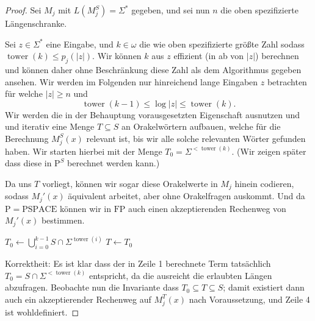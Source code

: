 \documentclass[nofonts]{uebung}
\theoremstyle{definition}
\def\P{\ensuremath{\mathrm{P}}}
\def\FP{\ensuremath{\mathrm{FP}}}
\def\PSPACE{\ensuremath{\mathrm{PSPACE}}}
\DeclareMathOperator{\tower}{tower}
\begin{document}
\begin{proof}
    Sei $M_j$ mit $L(M_j^S)=\Sigma^*$ gegeben, und sei nun $n$ die oben spezifizierte Längenschranke.

    Sei $z\in\Sigma^*$ eine Eingabe, und $k\in\omega$ die wie oben spezifizierte größte Zahl sodass $\tower(k)\leq p_j(|z|)$. Wir können $k$ aus $z$ effizient (in ab von $|z|$) berechnen und können daher ohne Beschränkung diese Zahl als dem Algorithmus gegeben ansehen.
    Wir werden im Folgenden nur hinreichend lange Eingaben $z$ betrachten für welche $|z|\geq n$ und 
    \[ \tower(k-1) \leq \log|z| \leq \tower(k). \]
    Wir werden die in der Behauptung vorausgesetzten  Eigenschaft ausnutzen und und iterativ eine Menge $T\subseteq S$ an Orakelwörtern aufbauen, welche für die Berechnung $M_j^S(x)$ relevant ist, bis wir alle solche relevanten Wörter gefunden haben. Wir starten hierbei mit der Menge $T_0=\Sigma^{<\tower(k)}$. (Wir zeigen später dass diese in $\P^S$ berechnet werden kann.)

    Da uns $T$ vorliegt, können wir sogar diese Orakelwerte in $M_j$ hinein codieren, sodass $M_j'(x)$ äquivalent arbeitet, aber ohne Orakelfragen auskommt. Und da $\P=\PSPACE$ können wir in $\FP$ auch einen akzeptierenden Rechenweg von $M_j'(x)$ bestimmen.

    \noindent
    \begin{algorithm}[H]
        $T_0\gets \bigcup_{i=0}^{k-1} S\cap\Sigma^{\tower(i)}$\;
        $T\gets T_0$\;
    \end{algorithm}

    Korrektheit: Es ist klar dass der in  Zeile 1 berechnete Term tatsächlich $T_0=S\cap\Sigma^{<\tower(k)}$ entspricht, da die ausreicht die erlaubten Längen abzufragen. Beobachte nun die Invariante dass $T_0\subseteq T\subseteq S$; damit existiert dann auch ein akzeptierender Rechenweg auf $M_j^{T}(x)$ nach Voraussetzung, und Zeile 4 ist wohldefiniert.


\end{proof}
\end{document}
